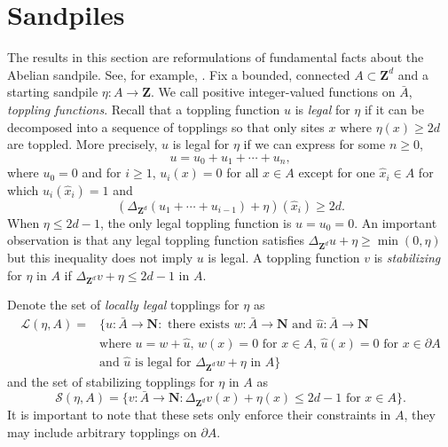 \documentclass[12pt]{amsart}
\newcommand{\Z}{\mathbf{Z}}
\newcommand{\N}{\mathbf{N}}
\begin{document}
\section{Sandpiles}\label{sec:sandpile}
The results in this section are reformulations of fundamental facts about the Abelian sandpile. See, for example, \cite{corry2018divisors,klivans2018mathematics,jarai2018sandpile,holroyd2008chip, redig2005mathematical}. Fix a bounded, connected $A \subset \Z^d$ and a starting sandpile $\eta: A \to \Z$.  We call positive integer-valued functions on $\bar{A}$,  {\it toppling functions}.  Recall that a toppling function $u$ is {\it legal} for $\eta$ if it can be decomposed into a sequence of topplings so that only sites $x$ where $\eta(x) \geq 2 d$ are toppled. More precisely, $u$ is legal for $\eta$ if we can express for some $n \geq 0 $,
\[
u = u_0 +  u_1 + \cdots + u_n, 
\]
where $u_0 = 0$ and for $i \geq 1$, $u_i(x) = 0$ for all $x \in A$ except for one $\hat{x}_i \in A$ for which $u_i(\hat{x}_i) = 1$
and 
\[
\left( \Delta_{\Z^d} (u_1 + \cdots +  u_{i-1})  + \eta \right)(\hat{x}_i) \geq 2 d.
\]
When $\eta \leq 2d -1$, the only legal toppling function is $u = u_0 = 0$. An important observation is that any legal toppling function satisfies $\Delta_{\Z^d} u + \eta \geq \min(0, \eta)$ but this inequality does not imply $u$ is legal. A toppling function $v$ is {\it stabilizing} for $\eta$ in $A$ if $\Delta_{\Z^d} v + \eta \leq 2 d-1$ in $A$. 

Denote the set of {\it locally legal} topplings for $\eta$ as
\begin{align*}
\mathcal{L}(\eta, A) = &\{ u: \bar{A} \to \N :  \mbox{ there exists $w:\bar{A} \to \N$ and $\hat{u}: \bar{A} \to \N$} \\
&\mbox{where $u = w + \hat{u}$, $w(x) = 0$ for $x \in A$, $\hat{u}(x) = 0$ for $x \in \partial A$}  \\
&\mbox{and $\hat{u}$ is legal for $\Delta_{\Z^d} w + \eta$ in $A$}\}
\end{align*}
and the set of stabilizing topplings for $\eta$ in $A$ as 
\[
\mathcal{S}(\eta, A)  = \{ v: \bar{A} \to \N:   \Delta_{\Z^d} v(x) + \eta(x)  \leq 2 d-1 \mbox{ for $x \in A$} \}.
\]
It is important to note that these sets only enforce their constraints in $A$, they may include arbitrary topplings on $\partial A$. 
\end{document}
